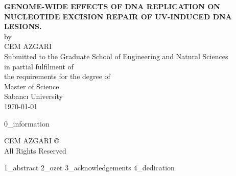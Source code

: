 \documentclass[12pt, leqno, oneside, a4paper]{book}
\begin{document}
 
\sloppy


\thispagestyle{empty} 
\onehalfspacing
\begin{center}
\MakeUppercase{\bfseries GENOME-WIDE EFFECTS OF DNA REPLICATION ON
NUCLEOTIDE EXCISION REPAIR OF UV-INDUCED
DNA LESIONS.} \\[7\baselineskip]

by \\
\MakeUppercase{Cem Azgari} \\[7\baselineskip]

Submitted to the Graduate School of Engineering and Natural Sciences \\
in partial fulfilment of \\
the requirements for the degree of \\
Master of Science \\[7\baselineskip]

Sabancı University \\
\Cemdateformat\today
\end{center}


\clearpage\pagebreak
{0_information}


\clearpage\pagebreak
\thispagestyle{empty} 
\null\vfill
\begin{centering}
CEM AZGARI \the\year\space $\copyright$ \\[\baselineskip]
All Rights Reserved \\
\end{centering} 


{1_abstract}
{2_ozet}
{3_acknowledgements}
{4_dedication}

\clearpage
\tableofcontents

\clearpage
{}
{\let\oldnumberline\numberline\renewcommand{\numberline}{\tablename~\oldnumberline}\listoftables}

\clearpage
{}
{\let\oldnumberline\numberline\renewcommand{\numberline}{\figurename~\oldnumberline}\listoffigures}
\end{document}
